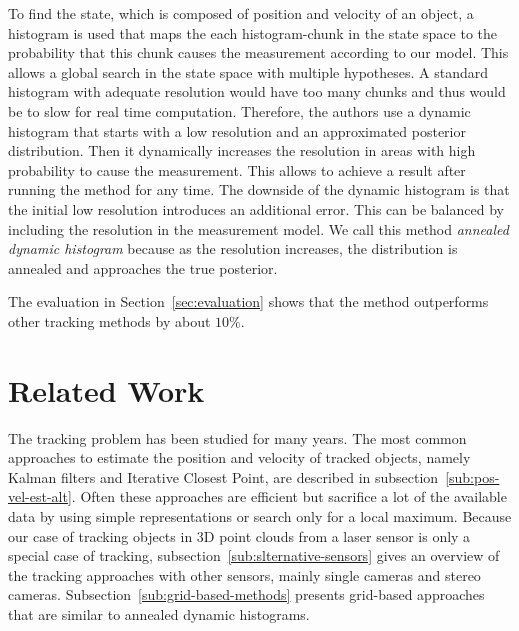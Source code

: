 \documentclass[twoside,a4paper,article]{combine}
\begin{document}
To find the state, which is composed of position and velocity of an
object, a histogram is used that maps the each histogram-chunk in the
state space to the probability that this chunk causes the measurement
according to our model. This allows a global search in the state space
with multiple hypotheses. A standard histogram with adequate
resolution would have too many chunks and thus would be to slow for
real time computation. Therefore, the authors use a dynamic histogram that
starts with a low resolution and an approximated posterior
distribution. Then it dynamically increases the resolution in areas
with high probability to cause the measurement. This allows to achieve
a result after running the method for any time. The downside of the
dynamic histogram is that the initial low resolution introduces an
additional error. This can be balanced by including the resolution in
the measurement model. We call this method \textit{annealed dynamic
  histogram} because as the resolution increases, the distribution is
annealed and approaches the true posterior.

The evaluation in Section~\ref{sec:evaluation} shows that the method
outperforms other tracking methods by about $10\%$.

\section{Related Work}
\label{sec:related-work}
The tracking problem has been studied for many years. The most common
approaches to estimate the position and velocity of tracked objects,
namely Kalman filters and Iterative Closest Point,
are described in subsection~\ref{sub:pos-vel-est-alt}. Often these
approaches are efficient but sacrifice a lot of the available data by
using simple representations or search only for a local maximum.
Because
our case of tracking objects in 3D point clouds from a laser sensor is
only a special case of tracking,
subsection~\ref{sub:slternative-sensors} gives an overview of the
tracking approaches with other sensors, mainly single cameras and
stereo cameras.
Subsection~\ref{sub:grid-based-methods} presents
grid-based approaches that are similar to annealed dynamic histograms.
\end{document}
